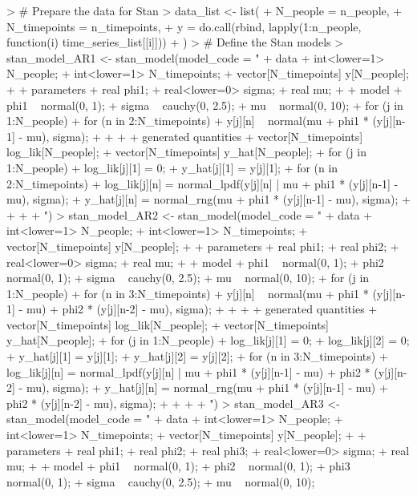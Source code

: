 \documentclass{article}
\begin{document}
\begin{Schunk}
\begin{Sinput}
> # Prepare the data for Stan
> data_list <- list(
+   N_people = n_people,
+   N_timepoints = n_timepoints,
+   y = do.call(rbind, lapply(1:n_people, function(i) time_series_list[[i]]))
+ )
> # Define the Stan models
> stan_model_AR1 <- stan_model(model_code = "
+ data {
+   int<lower=1> N_people;
+   int<lower=1> N_timepoints;
+   vector[N_timepoints] y[N_people];
+ }
+ parameters {
+   real phi1;
+   real<lower=0> sigma;
+   real mu;
+ }
+ model {
+   phi1 ~ normal(0, 1);
+   sigma ~ cauchy(0, 2.5);
+   mu ~ normal(0, 10);
+   for (j in 1:N_people) {
+     for (n in 2:N_timepoints) {
+       y[j][n] ~ normal(mu + phi1 * (y[j][n-1] - mu), sigma);
+     }
+   }
+ }
+ generated quantities {
+   vector[N_timepoints] log_lik[N_people];
+   vector[N_timepoints] y_hat[N_people];
+   for (j in 1:N_people) {
+     log_lik[j][1] = 0;
+     y_hat[j][1] = y[j][1];
+     for (n in 2:N_timepoints) {
+       log_lik[j][n] = normal_lpdf(y[j][n] | mu + phi1 * (y[j][n-1] - mu), sigma);
+       y_hat[j][n] = normal_rng(mu + phi1 * (y[j][n-1] - mu), sigma);
+     }
+   }
+ }
+ ")
> stan_model_AR2 <- stan_model(model_code = "
+ data {
+   int<lower=1> N_people;
+   int<lower=1> N_timepoints;
+   vector[N_timepoints] y[N_people];
+ }
+ parameters {
+   real phi1;
+   real phi2;
+   real<lower=0> sigma;
+   real mu;
+ }
+ model {
+   phi1 ~ normal(0, 1);
+   phi2 ~ normal(0, 1);
+   sigma ~ cauchy(0, 2.5);
+   mu ~ normal(0, 10);
+   for (j in 1:N_people) {
+     for (n in 3:N_timepoints) {
+       y[j][n] ~ normal(mu + phi1 * (y[j][n-1] - mu) + phi2 * (y[j][n-2] - mu), sigma);
+     }
+   }
+ }
+ generated quantities {
+   vector[N_timepoints] log_lik[N_people];
+   vector[N_timepoints] y_hat[N_people];
+   for (j in 1:N_people) {
+     log_lik[j][1] = 0;
+     log_lik[j][2] = 0;
+     y_hat[j][1] = y[j][1];
+     y_hat[j][2] = y[j][2];
+     for (n in 3:N_timepoints) {
+       log_lik[j][n] = normal_lpdf(y[j][n] | mu + phi1 * (y[j][n-1] - mu) + phi2 * (y[j][n-2] - mu), sigma);
+       y_hat[j][n] = normal_rng(mu + phi1 * (y[j][n-1] - mu) + phi2 * (y[j][n-2] - mu), sigma);
+     }
+   }
+ }
+ ")
> stan_model_AR3 <- stan_model(model_code = "
+ data {
+   int<lower=1> N_people;
+   int<lower=1> N_timepoints;
+   vector[N_timepoints] y[N_people];
+ }
+ parameters {
+   real phi1;
+   real phi2;
+   real phi3;
+   real<lower=0> sigma;
+   real mu;
+ }
+ model {
+   phi1 ~ normal(0, 1);
+   phi2 ~ normal(0, 1);
+   phi3 ~ normal(0, 1);
+   sigma ~ cauchy(0, 2.5);
+   mu ~ normal(0, 10);
}
\end{Sinput}
\end{Schunk}
\end{document}

